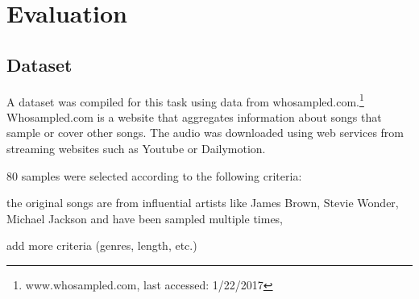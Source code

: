 \documentclass{article}
\begin{document}

\section{Evaluation}
\label{eval}

\subsection{Dataset}
A dataset was compiled for this task using data from whosampled.com.\footnote{www.whosampled.com, last accessed: 1/22/2017} Whosampled.com is a website that aggregates information about songs that sample or cover other songs. The audio was downloaded using web services from streaming websites such as Youtube or Dailymotion.

80 samples were selected according to the following criteria:
\begin{inparaenum}[(i)]
    \item   the original songs are from influential artists like James Brown, Stevie Wonder, Michael Jackson and have been sampled multiple times, 
    \item   {\color{red}add more criteria (genres, length, etc.)}
\end{inparaenum}
\end{document}
